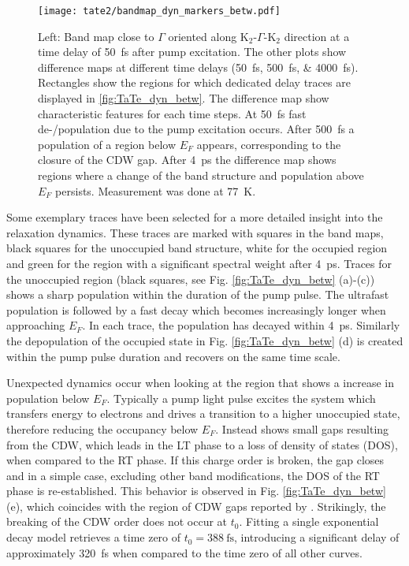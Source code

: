 \begin{figure}[t!]
	\centering
	\texttt{[image: tate2/bandmap\_dyn\_markers\_betw.pdf]}
	\caption{Left: Band map close to $\Gamma$ oriented along K$_2$-$\Gamma$-K$_2$ direction at a time delay of \qty{50}{\femto\second} after pump excitation. The other plots show difference maps at different time delays (\qtylist{50;500;4000}{\femto\second}). Rectangles show the regions for which dedicated delay traces are displayed in \ref{fig:TaTe_dyn_betw}. The difference map show characteristic features for each time steps. At \qty{50}{\femto\second} fast de-/population due to the pump excitation occurs. After \qty{500}{\femto\second} a population of a region below $E_F$ appears, corresponding to the closure of the CDW gap. After \qty{4}{\pico\second} the difference map shows regions where a change of the band structure and population above $E_F$ persists. Measurement was done at \qty{77}{\kelvin}.}
	\label{fig:TaTe_bandmap_dyn_betw}
\end{figure}

Some exemplary traces have been selected for a more detailed insight into the relaxation dynamics.
These traces are marked with squares in the band maps, black squares for the unoccupied band structure, white for the occupied region and green for the region with a significant spectral weight after \qty{4}{\pico\second}.
Traces for the unoccupied region (black squares, see Fig. \ref{fig:TaTe_dyn_betw} (a)-(c)) shows a sharp population within the duration of the pump pulse.
The ultrafast population is followed by a fast decay which becomes increasingly longer when approaching $E_F$.
In each trace, the population has decayed within \qty{4}{\pico\second}.
Similarly the depopulation of the occupied state in Fig. \ref{fig:TaTe_dyn_betw} (d) is created within the pump pulse duration and recovers on the same time scale.

Unexpected dynamics occur when looking at the region that shows a increase in population below $E_F$.
Typically a pump light pulse excites the system which transfers energy to electrons and drives a transition to a higher unoccupied state, therefore reducing the occupancy below $E_F$.
Instead  shows small gaps resulting from the CDW, which leads in the LT phase to a loss of density of states (DOS), when compared to the RT phase.
If this charge order is broken, the gap closes and in a simple case, excluding other band modifications, the DOS of the RT phase is re-established.
This behavior is observed in Fig. \ref{fig:TaTe_dyn_betw} (e), which coincides with the region of CDW gaps reported by \cite{lin_evidence_2022}.
Strikingly, the breaking of the CDW order does not occur at $t_0$.
Fitting a single exponential decay model retrieves a time zero of $t_0=\qty{388}{\femto\second}$, introducing a significant delay of approximately \qty{320}{\femto\second} when compared to the time zero of all other curves.

